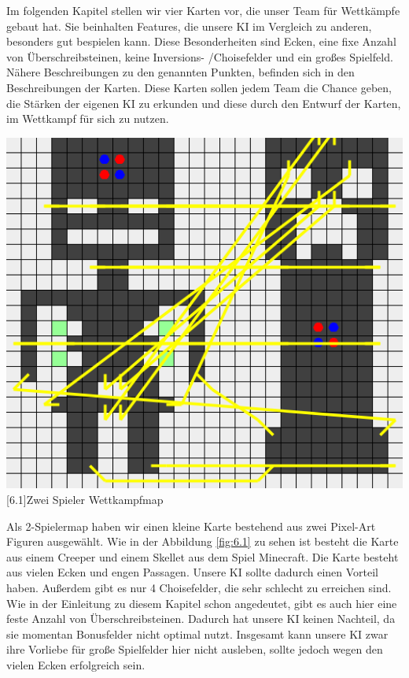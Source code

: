 \documentclass[12pt,a4paper,bibliography=totocnumbered,listof=totocnumbered]{scrartcl}
\begin{document}
	Im folgenden Kapitel stellen wir vier Karten vor, die unser Team für Wettkämpfe gebaut hat. Sie beinhalten Features, die unsere KI im Vergleich zu anderen, besonders gut bespielen kann. Diese Besonderheiten sind Ecken, eine fixe Anzahl von Überschreibsteinen, keine Inversions- /Choisefelder und ein großes Spielfeld. Nähere Beschreibungen zu den genannten Punkten, befinden sich in den Beschreibungen der Karten. Diese Karten sollen jedem Team die Chance geben, die Stärken der eigenen KI zu erkunden und diese durch den Entwurf der Karten, im Wettkampf für sich zu nutzen.
	
	\vspace{1em}
	\begin{minipage}{\linewidth}
		\centering
		\includegraphics[width=0.66\linewidth]{pics/Kapitel_6/CreeperMap.png}
		[6.1]{Zwei Spieler Wettkampfmap}
		\label{fig:6.1}
	\end{minipage}
	\vspace{1em}
	
	Als 2-Spielermap haben wir einen kleine Karte bestehend aus zwei Pixel-Art Figuren ausgewählt. Wie in der Abbildung \ref{fig:6.1} zu sehen ist besteht die Karte aus einem Creeper und einem Skellet aus dem Spiel Minecraft. Die Karte besteht aus vielen Ecken und engen Passagen. Unsere KI sollte dadurch einen Vorteil haben. Außerdem gibt es nur 4 Choisefelder, die sehr schlecht zu erreichen sind. Wie in der Einleitung zu diesem Kapitel schon angedeutet, gibt es auch hier eine feste Anzahl von Überschreibsteinen. Dadurch hat unsere KI keinen Nachteil, da sie momentan Bonusfelder nicht optimal nutzt. Insgesamt kann unsere KI zwar ihre \glqq Vorliebe \grqq{} für große Spielfelder hier nicht ausleben, sollte jedoch wegen den vielen Ecken erfolgreich sein.
	
\end{document}
